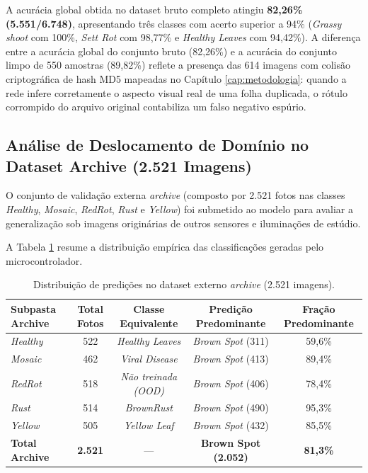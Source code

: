 A acurácia global obtida no dataset bruto completo atingiu \textbf{82,26\% (5.551/6.748)}, apresentando três classes com acerto superior a 94\% (\textit{Grassy shoot} com 100\%, \textit{Sett Rot} com 98,77\% e \textit{Healthy Leaves} com 94,42\%). A diferença entre a acurácia global do conjunto bruto (82,26\%) e a acurácia do conjunto limpo de 550 amostras (89,82\%) reflete a presença das 614 imagens com colisão criptográfica de hash MD5 mapeadas no Capítulo \ref{cap:metodologia}: quando a rede infere corretamente o aspecto visual real de uma folha duplicada, o rótulo corrompido do arquivo original contabiliza um falso negativo espúrio.

\subsection{Análise de Deslocamento de Domínio no Dataset Archive (2.521 Imagens)}

O conjunto de validação externa \textit{archive} (composto por 2.521 fotos nas classes \textit{Healthy}, \textit{Mosaic}, \textit{RedRot}, \textit{Rust} e \textit{Yellow}) foi submetido ao modelo para avaliar a generalização sob imagens originárias de outros sensores e iluminações de estúdio.

A Tabela \ref{tab:dataset_archive} resume a distribuição empírica das classificações geradas pelo microcontrolador.

\begin{table}[H]
\centering
\small
\caption{Distribuição de predições no dataset externo \textit{archive} (2.521 imagens).}
\label{tab:dataset_archive}
\begin{tabular}{lcccc}
\toprule
\textbf{Subpasta Archive} & \textbf{Total Fotos} & \textbf{Classe Equivalente} & \textbf{Predição Predominante} & \textbf{Fração Predominante} \\
\midrule
\textit{Healthy} & 522 & \textit{Healthy Leaves} & \textit{Brown Spot} (311) & 59,6\% \\
\textit{Mosaic}  & 462 & \textit{Viral Disease}  & \textit{Brown Spot} (413) & 89,4\% \\
\textit{RedRot}  & 518 & \textit{Não treinada (OOD)} & \textit{Brown Spot} (406) & 78,4\% \\
\textit{Rust}    & 514 & \textit{BrownRust}      & \textit{Brown Spot} (490) & 95,3\% \\
\textit{Yellow}  & 505 & \textit{Yellow Leaf}    & \textit{Brown Spot} (432) & 85,5\% \\
\midrule
\textbf{Total Archive} & \textbf{2.521} & --- & \textbf{Brown Spot (2.052)} & \textbf{81,3\%} \\
\bottomrule
\end{tabular}
\end{table}

